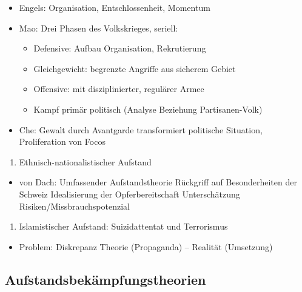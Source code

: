 {}\documentclass[a4paper]{article}
\providecommand{\tightlist}{\setlength{\itemsep}{1mm}\setlength{\parskip}{1mm}}
\begin{document}
\begin{itemize}
	\tightlist
	\item
	      Engels: Organisation, Entschlossenheit, Momentum
	\item
	      Mao: Drei Phasen des Volkskrieges, seriell:

	      \begin{itemize}
		      \tightlist
		      \item
		            Defensive: Aufbau Organisation, Rekrutierung
		      \item
		            Gleichgewicht: begrenzte Angriffe aus sicherem Gebiet
		      \item
		            Offensive: mit disziplinierter, regulärer Armee
		      \item
		            Kampf primär politisch (Analyse Beziehung Partisanen-Volk)
	      \end{itemize}
	\item
	      Che: Gewalt durch Avantgarde transformiert politische Situation,
	      Proliferation von Focos
\end{itemize}

\begin{enumerate}
	\def\labelenumi{\arabic{enumi}.}
	\setcounter{enumi}{1}
	\tightlist
	\item
	      Ethnisch-nationalistischer Aufstand
\end{enumerate}

\begin{itemize}
	\tightlist
	\item
	      von Dach: Umfassender Aufstandstheorie Rückgriff auf Besonderheiten
	      der Schweiz Idealisierung der Opferbereitschaft Unterschätzung
	      Risiken/Missbrauchspotenzial
\end{itemize}

\begin{enumerate}
	\def\labelenumi{\arabic{enumi}.}
	\setcounter{enumi}{2}
	\tightlist
	\item
	      Islamistischer Aufstand: Suizidattentat und Terrorismus
\end{enumerate}

\begin{itemize}
	\tightlist
	\item
	      Problem: Diskrepanz Theorie (Propaganda) -- Realität (Umsetzung)
\end{itemize}

\subsection{Aufstandsbekämpfungstheorien}\label{aufstandsbekuxe4mpfungstheorien}
\end{document}
